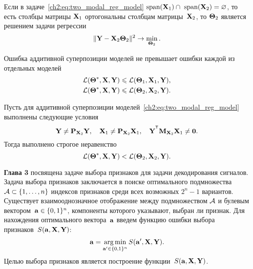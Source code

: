 \documentclass[11pt, a5paper]{dissert}
\begin{document}
\begin{statement}
	Если в задаче~\eqref{ch2:eq:two_modal_reg_model} $\text{span}(\mathbf{X}_1) \cap \text{ span}(\mathbf{X}_2) = \varnothing$, то есть столбцы матрицы $\mathbf{X}_1$ ортогональны столбцам матрицы~$\mathbf{X}_2$, то $\boldsymbol{\Theta}_2$ является решением задачи регрессии
	\[
		\| \mathbf{Y} -  \mathbf{X}_{2} \boldsymbol{\Theta}_2 \|^2 \rightarrow \min_{\boldsymbol{\Theta}_2}.
	\]
\end{statement}

\begin{statement}
	Ошибка аддитивной суперпозиции моделей не превышает ошибки каждой из отдельных моделей
	\begin{align*}
		\mathcal{L}(\boldsymbol{\Theta}^*, \mathbf{X}, \mathbf{Y}) &\leqslant \mathcal{L}(\boldsymbol{\Theta}_1, \mathbf{X}_1, \mathbf{Y}), \\
		\mathcal{L}(\boldsymbol{\Theta}^*, \mathbf{X}, \mathbf{Y}) &\leqslant \mathcal{L}(\boldsymbol{\Theta}_2, \mathbf{X}_2, \mathbf{Y}).
	\end{align*}
\end{statement}

\begin{statement}
	\label{ch2:stat:strict:two_model}
	Пусть для аддитивной суперпозиции моделей~\eqref{ch2:eq:two_modal_reg_model} выполнены следующие условия
	\[
		\bY \neq \bP_{\bX_2} \bY, \quad \bX_1 \neq \bP_{\bX_2} \bX_1, \quad \bY^{\T} \bM_{\bX_2} \bX_1 \neq \bZero.
	\]
	Тогда выполнено строгое неравенство
	\[
		\mathcal{L}(\boldsymbol{\Theta}^*, \mathbf{X}, \mathbf{Y}) < \mathcal{L}(\boldsymbol{\Theta}_2, \mathbf{X}_2, \mathbf{Y}).
	\]
\end{statement}

\textbf{Глава 3} посвящена задаче выбора признаков для задачи декодирования сигналов.
Задача выбора признаков заключается в поиске оптимального подмножества~$\mathcal{A} \subset \{ 1, \dots, n \}$ индексов признаков среди всех возможных $2^n - 1$ вариантов. 
Существует взаимооднозначное отображение между подмножеством $\mathcal{A}$ и булевым вектором~$\mathbf{a} \in \{0, 1\}^n$, компоненты которого указывают, выбран ли признак. 
Для нахождения оптимального вектора~$\mathbf{a}$ введем функцию ошибки выбора признаков~$S(\mathbf{a}, \mathbf{X}, \mathbf{Y})$:
\begin{equation}
	\mathbf{a} = \mathop{\arg \min}\limits_{\mathbf{a}' \in \{0, 1\}^n} S(\mathbf{a}', \mathbf{X}, \mathbf{Y}).
	\label{ch3:eq:feature_selection}
\end{equation}
Целью выбора признаков является построение функции~$S (\mathbf{a}, \mathbf{X}, \mathbf{Y})$. 
\end{document}
